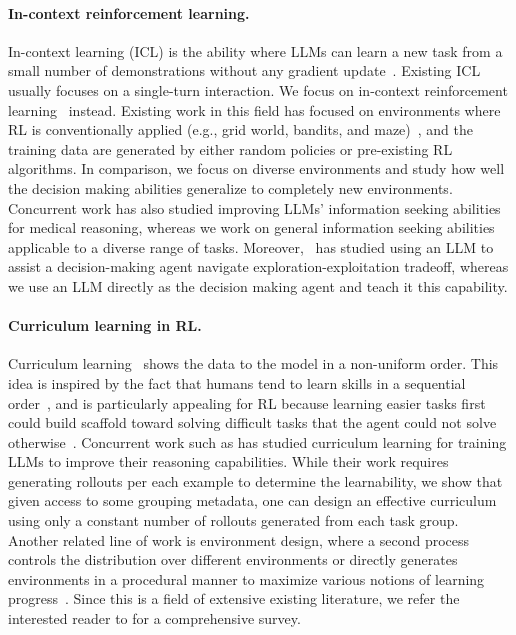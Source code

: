 \documentclass{article}
\theoremstyle{plain}
\theoremstyle{definition}
\theoremstyle{remark}
\begin{document}
\paragraph{In-context reinforcement learning.} In-context learning (ICL) is the ability where LLMs can learn a new task from a small number of demonstrations without any gradient update~\citep{brown2020language}. Existing ICL usually focuses on a single-turn interaction. We focus on in-context reinforcement learning~\citep{laskin2022context, raparthy2023generalization, lee2024supervised, lin2024transformers} instead. Existing work in this field has focused on environments where RL is conventionally applied (e.g., grid world, bandits, and maze)~\citep{monea2025llmsincontextbanditreinforcement}, and the training data are generated by either random policies or pre-existing RL algorithms. In comparison, we focus on diverse environments and study how well the decision making abilities generalize to completely new environments. Concurrent work has also studied improving LLMs' information seeking abilities~\citep{li2025aligningllmsaskgood} for medical reasoning, whereas we work on general information seeking abilities applicable to a diverse range of tasks. Moreover,~\citet{harris2025uselargelanguagemodel} has studied using an LLM to assist a decision-making agent navigate exploration-exploitation tradeoff, whereas we use an LLM directly as the decision making agent and teach it this capability.
\paragraph{Curriculum learning in RL.}
Curriculum learning~\citep{bengio2009curriculum} shows the data to the model in a non-uniform order. This idea is inspired by the fact that humans tend to learn skills in a sequential order~\citep{skinner1958reinforcement}, and is particularly appealing for RL because learning easier tasks first could build scaffold toward solving difficult tasks that the agent could not solve otherwise~\citep{andrychowicz2017hindsight, florensa2017reverse, fang2019curriculum, portelas2020teacher}. Concurrent work such as \citet{foster2025learningreasonfrontierlearnability} has studied curriculum learning for training LLMs to improve their reasoning capabilities. While their work requires generating rollouts per each example to determine the learnability, we show that given access to some grouping metadata, one can design an effective curriculum using only a constant number of rollouts generated from each task group.
Another related line of work is environment design, where a second process controls the distribution over different environments or directly generates environments in a procedural manner to maximize various notions of learning progress~\citep{wang2019paired, dennis2020emergent, jiang2021prioritized, jiang2021replay, bruce2024genie}.
Since this is a field of extensive existing literature, we refer the interested reader to \citet{portelas2020automatic} for a comprehensive survey.
\end{document}
